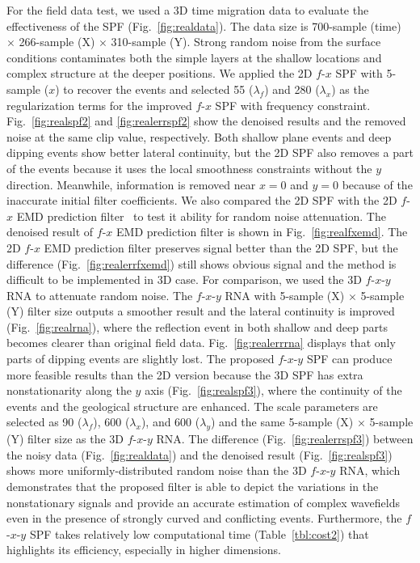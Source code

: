 For the field data test, we used a 3D time migration data to evaluate
the effectiveness of the SPF (Fig.~\ref{fig:realdata}). The data size
is 700-sample (time) $\times$ 266-sample (X) $\times$ 310-sample
(Y). Strong random noise from the surface conditions contaminates both
the simple layers at the shallow locations and complex structure at
the deeper positions.  We applied the 2D $f$-$x$ SPF with 5-sample
($x$) to recover the events and selected 55 ($\lambda_{f}$) and 280
($\lambda_{x}$) as the regularization terms for the improved $f$-$x$
SPF with frequency constraint. Fig.~\ref{fig:realspf2} and
\ref{fig:realerrspf2} show the denoised results and the removed noise
at the same clip value, respectively. Both shallow plane events and
deep dipping events show better lateral continuity, but the 2D SPF
also removes a part of the events because it uses the local smoothness
constraints without the $y$ direction. Meanwhile, information is
removed near $x=0$ and $y=0$ because of the inaccurate initial filter
coefficients.  We also compared the 2D SPF with the 2D $f$-$x$ EMD
prediction filter~\cite{Chen14} to test it ability for random noise
attenuation. The denoised result of $f$-$x$ EMD prediction filter is
shown in Fig.~\ref{fig:realfxemd}. The 2D $f$-$x$ EMD prediction
filter preserves signal better than the 2D SPF, but the difference
(Fig.~\ref{fig:realerrfxemd}) still shows obvious signal and the
method is difficult to be implemented in 3D case.  For comparison, we
used the 3D $f$-$x$-$y$ RNA to attenuate random noise.  The
$f$-$x$-$y$ RNA with 5-sample (X) $\times$ 5-sample (Y) filter size
outputs a smoother result and the lateral continuity is improved
(Fig.~\ref{fig:realrna}), where the reflection event in both shallow
and deep parts becomes clearer than original field
data. Fig.~\ref{fig:realerrrna} displays that only parts of dipping
events are slightly lost.  The proposed $f$-$x$-$y$ SPF can produce
more feasible results than the 2D version because the 3D SPF has extra
nonstationarity along the $y$ axis (Fig.~\ref{fig:realspf3}), where
the continuity of the events and the geological structure are
enhanced. The scale parameters are selected as 90 ($\lambda_{f}$), 600
($\lambda_{x}$), and 600 ($\lambda_{y}$) and the same 5-sample (X)
$\times$ 5-sample (Y) filter size as the 3D $f$-$x$-$y$ RNA.  The
difference (Fig.~\ref{fig:realerrspf3}) between the noisy data
(Fig.~\ref{fig:realdata}) and the denoised result
(Fig.~\ref{fig:realspf3}) shows more uniformly-distributed random
noise than the 3D $f$-$x$-$y$ RNA, which demonstrates that the
proposed filter is able to depict the variations in the nonstationary
signals and provide an accurate estimation of complex wavefields even
in the presence of strongly curved and conflicting events.
Furthermore, the $f$-$x$-$y$ SPF takes relatively low computational
time (Table~\ref{tbl:cost2}) that highlights its efficiency,
especially in higher dimensions.

